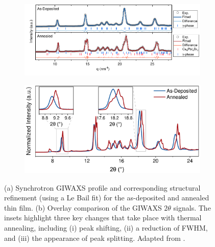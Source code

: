 \begin{figure}[ht!]
    \centering
    \begin{subfigure}[b]{\textwidth}
    \centering
        \includegraphics[width=0.85\linewidth]{chapters/material_properties/images/GIWAXS_Before_After.pdf}
        \caption{}
        \label{fig:ch2:giwaxs_before_after:model}
    \end{subfigure}

    \vspace{0.5cm}
    
    \begin{subfigure}[b]{\textwidth}
    \centering
    \hspace{-1.4cm}
        \includegraphics[width=0.68\linewidth]{chapters/material_properties/images/giwaxs_overlayed.pdf}
        \caption{}
        \label{fig:ch2:giwaxs_before_after:overlay}
    \end{subfigure}
    
    \caption[Synchrotron-based GIWAXS of the as-deposited and annealed perovskite state.]{(a) Synchrotron GIWAXS profile and corresponding structural refinement (using a Le Bail fit) for the as-deposited and annealed  thin film. (b) Overlay comparison of the GIWAXS $2\theta$ signals. The insets highlight three key changes that take place with thermal annealing, including (i) peak shifting, (ii) a reduction of FWHM, and (iii) the appearance of peak splitting. Adapted from \cite{Papadopoulou2024InEllipsometry}.
}
    \label{fig:ch2:giwaxs_before_after:}
\end{figure}



